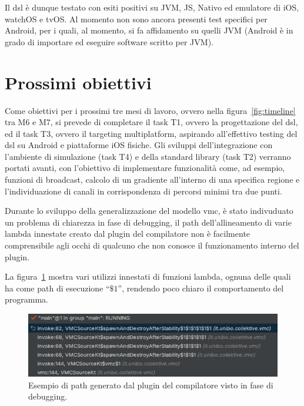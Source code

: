 \documentclass[13pt, a4paper]{article}
\begin{document}
Il \ac{dsl} è dunque testato con esiti positivi su JVM, JS, Nativo ed emulatore di iOS, watchOS e tvOS.
%
Al momento non sono ancora presenti test specifici per Android,
per i quali, al momento,
si fa affidamento su quelli \ac{JVM}
(Android è in grado di importare ed eseguire software scritto per \ac{JVM}).

\section{Prossimi obiettivi}\label{sec:prossimi-obiettivi}


Come obiettivi per i prossimi tre mesi di lavoro, ovvero nella figura~\ref{fig:timeline} tra M6 e M7,
    si prevede di completare il task T1, ovvero la progettazione del \ac{dsl},
    ed il task T3, ovvero il targeting multiplatform,
    aspirando all'effettivo testing del \ac{dsl} su Android e piattaforme iOS fisiche.
%
Gli sviluppi dell'integrazione con l'ambiente di simulazione (task T4) e della standard library (task T2) verranno portati
avanti, con l'obiettivo di implementare funzionalità come, ad esempio, funzioni di broadcast,
calcolo di un gradiente all'interno di una specifica regione e l'individuazione di canali in corrispondenza di percorsi minimi tra due punti.

Durante lo sviluppo della generalizzazione del modello \ac{vmc}, è stato indivuduato un problema di chiarezza in fase di debugging,
il path dell'allineamento di varie lambda innestate creato dal plugin del compilatore non è facilmente comprensibile
agli occhi di qualcuno che non conosce il funzionamento interno del plugin.

La figura~\ref{fig:alignment} mostra vari utilizzi innestati di funzioni lambda, ognuna delle quali ha come path di esecuzione
``$\$1$'', rendendo poco chiaro il comportamento del programma.
\begin{figure}
    \centering
    \includegraphics[width=\textwidth]{images/alignment}
    \caption{Esempio di path generato dal plugin del compilatore visto in fase di debugging.}
    \label{fig:alignment}
\end{figure}
\end{document}
